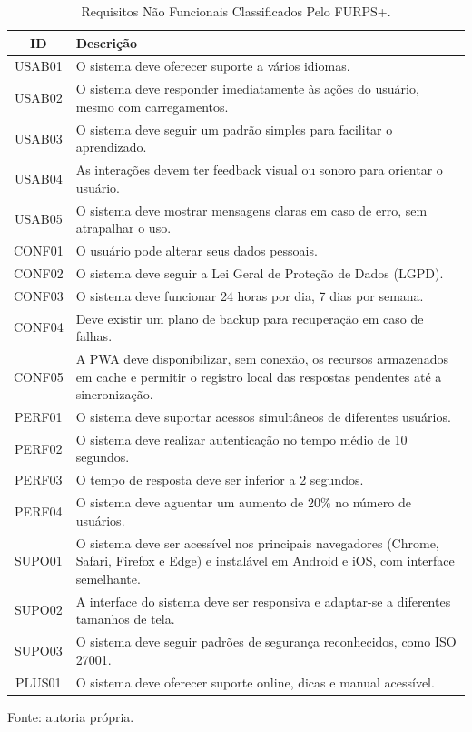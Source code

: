 \renewcommand{\arraystretch}{1.5}
\begin{table}[H]
    \centering
    \caption{Requisitos Não Funcionais Classificados Pelo FURPS+.}
    \label{tab:requisitosnaofunc}
    
    \begin{tabularx}{\textwidth}{|c|X|}
        \hline
        \textbf{ID} & \textbf{Descrição} \\
        \hline
        USAB01 & O sistema deve oferecer suporte a vários idiomas.  \\
        \hline
        USAB02 & O sistema deve responder imediatamente às ações do usuário, mesmo com carregamentos. \\
        \hline
        USAB03 & O sistema deve seguir um padrão simples para facilitar o aprendizado. \\
        \hline
        USAB04 & As interações devem ter feedback visual ou sonoro para orientar o usuário. \\
        \hline
        USAB05 & O sistema deve mostrar mensagens claras em caso de erro, sem atrapalhar o uso. \\
        \hline
        CONF01 & O usuário pode alterar seus dados pessoais. \\
        \hline
        CONF02 & O sistema deve seguir a Lei Geral de Proteção de Dados (LGPD). \\
        \hline
        CONF03 & O sistema deve funcionar 24 horas por dia, 7 dias por semana. \\
        \hline
        CONF04 & Deve existir um plano de backup para recuperação em caso de falhas. \\
        \hline
        CONF05 & A PWA deve disponibilizar, sem conexão, os recursos armazenados em cache e permitir o registro local das respostas pendentes até a sincronização. \\
        \hline
        PERF01 & O sistema deve suportar acessos simultâneos de diferentes usuários. \\
        \hline
        PERF02 & O sistema deve realizar autenticação no tempo médio de 10 segundos. \\
        \hline
        PERF03 & O tempo de resposta deve ser inferior a 2 segundos. \\
        \hline
        PERF04 & O sistema deve aguentar um aumento de 20\% no número de usuários. \\
        \hline
        SUPO01 & O sistema deve ser acessível nos principais navegadores (Chrome, Safari, Firefox e Edge) e instalável em Android e iOS, com interface semelhante. \\
        \hline
        SUPO02 & A interface do sistema deve ser responsiva e adaptar-se a diferentes tamanhos de tela. \\
        \hline
        SUPO03 & O sistema deve seguir padrões de segurança reconhecidos, como ISO 27001. \\
        \hline
        PLUS01 & O sistema deve oferecer suporte online, dicas e manual acessível. \\
        \hline
    \end{tabularx}
    
    \vspace{0.5em}
    \small Fonte: autoria própria.
\end{table}
